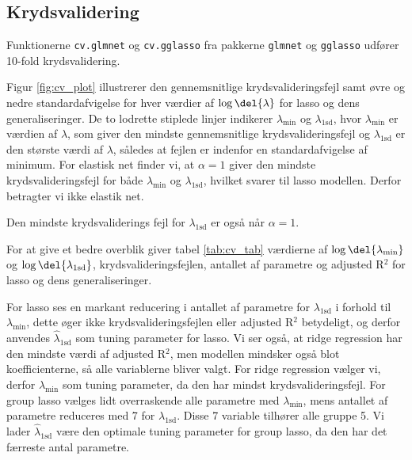 \subsection{Krydsvalidering}
Funktionerne \texttt{cv.glmnet} og \texttt{cv.gglasso} fra pakkerne \texttt{glmnet} og \texttt{gglasso} udfører 10-fold krydsvalidering.

Figur \ref{fig:cv_plot} illustrerer den gennemsnitlige krydsvalideringsfejl samt øvre og nedre standardafvigelse for hver værdier af $\log \del{\lambda}$ for lasso og dens generaliseringer. 
De to lodrette stiplede linjer indikerer \(\lambda_{\text{min}}\) og \(\lambda_\text{1sd}\), hvor \(\lambda_{\text{min}}\) er værdien af \(\lambda\), som giver den mindste gennemsnitlige krydsvalideringsfejl og \(\lambda_\text{1sd}\) er den største værdi af \(\lambda\), således at fejlen er indenfor en standardafvigelse af minimum. 
For elastisk net finder vi, at $\alpha =1$ giver den mindste krydsvalideringsfejl for både \(\lambda_\text{min}\) og  \(\lambda_\text{1sd}\), hvilket svarer til lasso modellen.  Derfor betragter vi ikke elastik net. 

Den mindste krydsvaliderings fejl for $\lambda_\text{1sd}$ er også når $\alpha = 1$. 
%



For at give et bedre overblik giver tabel \ref{tab:cv_tab} værdierne af $\log \del{ \lambda_{\min}}$ og $\log \del{ \lambda_{1\text{sd}}}$, krydsvalideringsfejlen, antallet af parametre og adjusted R$^2$ for lasso og dens generaliseringer.

For lasso ses en markant reducering i antallet af parametre for $\lambda_{1\text{sd}}$ i forhold til $\lambda_{\min}$, dette øger ikke krydsvalideringsfejlen eller adjusted R$^2$ betydeligt, og derfor anvendes $\widehat{\lambda}_{1\text{sd}}$ som tuning parameter for lasso. 
Vi ser også, at ridge regression har den mindste værdi af adjusted R$^2$, men modellen mindsker også blot koefficienterne, så alle variablerne bliver valgt. 
For ridge regression vælger vi, derfor $\widehat{\lambda}_{\min}$ som tuning parameter, da den har mindst krydsvalideringsfejl.
For group lasso vælges lidt overraskende alle parametre med \(\lambda_\text{min}\), mens antallet af parametre reduceres med 7 for $\lambda_{1\text{sd}}$. Disse 7 variable tilhører alle gruppe 5.
Vi lader $\widehat{\lambda}_{1\text{sd}}$ være den optimale tuning parameter for group lasso, da den har det færreste antal parametre. 

